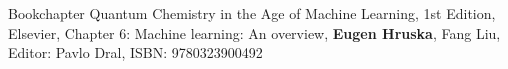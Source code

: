\begin{rubric}{Bookchapter}
\entry*[\hspace{1.05cm}2022] Quantum Chemistry in the Age of Machine Learning, 1st Edition, Elsevier, Chapter 6: Machine learning: An overview, \textbf{Eugen Hruska}, Fang Liu, Editor: Pavlo Dral, ISBN: 9780323900492
\end{rubric}